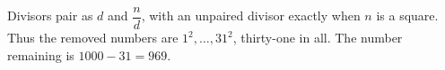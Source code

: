 Divisors pair as $d$ and $\dfrac{n}{d}$, with an unpaired divisor exactly when $n$ is a square. Thus the removed numbers are $1^2,\ldots,31^2$, thirty-one in all. The number remaining is $1000-31=\boxed{969}$.
